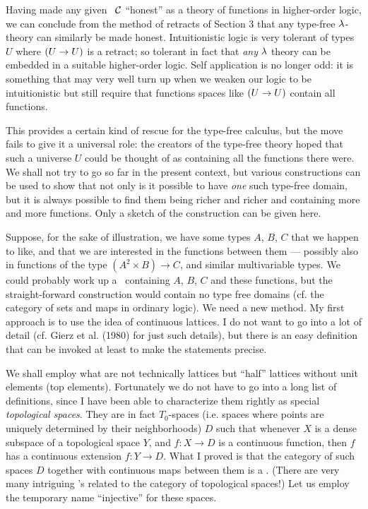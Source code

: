 Having made any given \ccc\ $\mathcal C$ ``honest'' as a theory of functions in higher-order
logic, we can conclude from the method of retracts of Section 3 that any type-free
$\lambda$-theory can similarly be made honest. Intuitionistic logic is very tolerant of types
$U$ where $(U\rightarrow U)$ is a retract; so tolerant in fact that {\it any} $\lambda$ theory can be
embedded in a suitable higher-order logic. Self application is no longer odd: it is
something that may very well turn up when we weaken our logic to be intuitionistic but
still require that functions spaces like $(U\rightarrow U)$ contain all functions.

This provides a certain kind of rescue for the type-free calculus, but the move fails to
give it a universal role: the creators of the type-free theory hoped that such a universe
$U$ could be thought of as containing all the functions there were. We shall not try to go
so far in the present context, but various constructions can be used to show that not
only is it possible to have {\it one} such type-free domain, but it is always possible to
find them being richer and richer and containing more and more functions. Only a sketch of
the construction can be given here.

Suppose, for the sake of illustration, we have some types $A$, $B$, $C$ that we happen to
like, and that we are interested in the functions between them --- possibly also in
functions of the type $(A^2 \times B) \to C$, and similar multivariable types. We could
probably work up a \ccc\  containing $A$, $B$, $C$ and these functions, but the
straight-forward construction would contain no type free domains (cf. the category of sets
and maps in ordinary logic). We need a new method. My first approach is to use the idea of
continuous lattices. I do not want to go into a lot of detail (cf. Gierz et al. (1980) for
just such details), but there is an easy definition that can be invoked at least to make
the statements precise.

We shall employ what are not technically lattices but ``half'' lattices without unit
elements (top elements). Fortunately we do not have to go into a long list of definitions,
since I have been able to characterize them rightly as special {\it topological spaces}.
They are in fact $T_0$-spaces (i.e. spaces where points are uniquely determined by their
neighborhoods) $D$ such that whenever $X$ is a dense subspace of a topological space $Y$,
and $f : X\to D$ is a continuous function, then $f$ has a continuous extension $f:Y\to D$.
What I proved is that the category of such spaces $D$ together with continuous maps
between them is a \ccc . (There are very many intriguing \ccc's related to the category of
topological spaces!) Let us employ the temporary name ``injective'' for these spaces.

